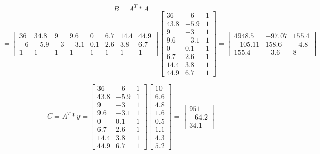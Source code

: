 \documentclass[a4paper,norsk]{article}
\begin{document}
\begin{equation*}B = A^{T} * A \end{equation*}
\begin{equation*}
= \begin{bmatrix}36 & 34.8 & 9 & 9.6 & 0 & 6.7&14.4&44.9\\ -6 & -5.9 &-3&-3.1&0.1&2.6&3.8&6.7\\1 & 1 & 1 & 1& 1 & 1 & 1 & 1\end{bmatrix}
\begin{bmatrix}36 & -6 & 1 \\ 43.8 & -5.9 & 1 \\9 & -3 & 1 \\ 9.6 & -3.1 & 1 \\0 & 0.1 & 1 \\6.7& 2.6 & 1 \\14.4 & 3.8 & 1 \\ 44.9 & 6.7 & 1\end{bmatrix}
=\begin{bmatrix}4948.5 & -97.07 & 155.4 \\ -105.11 & 158.6 & -4.8 \\ 155.4 & -3.6 & 8\end{bmatrix}
\end{equation*} 

\begin{equation*}
C = A^{T} * y = \begin{bmatrix}36 & -6 & 1 \\ 43.8 & -5.9 & 1 \\9 & -3 & 1 \\ 9.6 & -3.1 & 1 \\0 & 0.1 & 1 \\6.7& 2.6 & 1 \\14.4 & 3.8 & 1 \\ 44.9 & 6.7 & 1 \end{bmatrix}
\begin{bmatrix}10 \\ 6.6\\4.8\\1.6\\0.5\\1.1\\4.3\\5.2\end{bmatrix}
=\begin{bmatrix} 951 \\ -64.2 \\ 34.1 \end{bmatrix}
\end{equation*}
\end{document}
